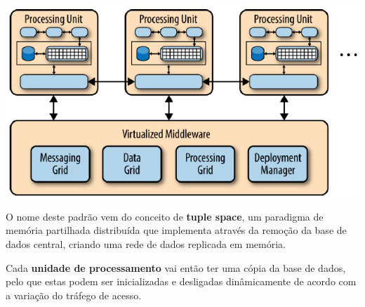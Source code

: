 \documentclass{article}
\begin{document}
\begin{center}
  \includegraphics[scale=0.5]{71}
\end{center}

O nome deste padrão vem do conceito de \textbf{tuple space}, um paradigma de memória partilhada
distribuída que implementa através da remoção da base de dados central, criando uma rede
de dados replicada em memória.

\vspace{2mm}

Cada \textbf{unidade de processamento} vai então ter uma cópia da base de dados, pelo que estas
podem ser inicializadas e desligadas dinâmicamente de acordo com a variação do tráfego de
acesso.

\pagebreak
\end{document}
